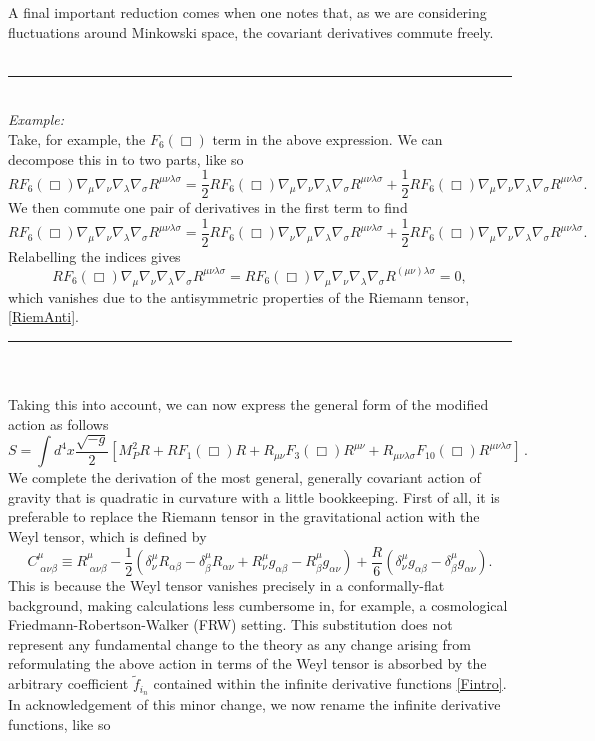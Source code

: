 A final important reduction comes when one notes that, as we are considering fluctuations around Minkowski space, the covariant derivatives commute freely.\\\\
\noindent\rule[0.5ex]{\linewidth}{0.25pt} 
\\\emph{Example:}
\\Take, for example, the $F_6(\Box)$ term in the above expression. We can decompose this in to two parts, like so
\[
RF_{6}(\Box)\nabla_{\mu}\nabla_{\nu}\nabla_{\lambda}\nabla_{\sigma}R^{\mu\nu\lambda\sigma}=\frac{1}{2}RF_{6}(\Box)\nabla_{\mu}\nabla_{\nu}\nabla_{\lambda}\nabla_{\sigma}R^{\mu\nu\lambda\sigma}+\frac{1}{2}RF_{6}(\Box)\nabla_{\mu}\nabla_{\nu}\nabla_{\lambda}\nabla_{\sigma}R^{\mu\nu\lambda\sigma}
.\]
We then commute one pair of derivatives in the first term to find
\[
RF_{6}(\Box)\nabla_{\mu}\nabla_{\nu}\nabla_{\lambda}\nabla_{\sigma}R^{\mu\nu\lambda\sigma}=\frac{1}{2}RF_{6}(\Box)\nabla_{\nu}\nabla_{\mu}\nabla_{\lambda}\nabla_{\sigma}R^{\mu\nu\lambda\sigma}+\frac{1}{2}RF_{6}(\Box)\nabla_{\mu}\nabla_{\nu}\nabla_{\lambda}\nabla_{\sigma}R^{\mu\nu\lambda\sigma}.
\]
Relabelling the indices gives
\[
RF_{6}(\Box)\nabla_{\mu}\nabla_{\nu}\nabla_{\lambda}\nabla_{\sigma}R^{\mu\nu\lambda\sigma}=RF_{6}(\Box)\nabla_{\mu}\nabla_{\nu}\nabla_{\lambda}\nabla_{\sigma}R^{(\mu\nu)\lambda\sigma}=0
,\]
which vanishes due to the antisymmetric properties of the Riemann tensor, \eqref{RiemAnti}.
\noindent\rule[0.5ex]{\linewidth}{0.25pt}
\\\\
Taking this into account, we can now  express the general form of the modified action as follows
\[ \label{f_action}
S=\int d^4x\frac{\sqrt{-g}}{2}\left[M_P^2R+R F_1(\Box)R
+R_{\mu\nu} F_3(\Box)R^{\mu\nu}
+R_{\mu\nu\lambda\sigma} F_{10}(\Box)R^{\mu\nu\lambda\sigma}\right]\,.
\]
We complete the derivation of the most general, generally covariant action of gravity that is quadratic in curvature with a little bookkeeping. First of all, it is preferable to replace the Riemann tensor in the gravitational action with the Weyl tensor, which is defined by
\[
\label{weyl}
C_{\;\alpha\nu\beta}^{\mu}\equiv R_{\;\alpha\nu\beta}^{\mu}-\frac{1}{2}(\delta_{\nu}^{
\mu}R_{\alpha\beta}-\delta_{\beta}^{\mu}R_{\alpha\nu}+R_{\nu}^{\mu}g_{
\alpha\beta}-R_{\beta}^{\mu}g_{\alpha\nu})+\frac{R}{6}(\delta_{\nu}^{\mu}g_{
\alpha\beta}-\delta_{\beta}^{\mu}g_{\alpha\nu})
.\]
This is because the Weyl tensor vanishes precisely in a conformally-flat background, making calculations less cumbersome in, for example, a cosmological Friedmann-Robertson-Walker (FRW) setting. This substitution does not represent any fundamental change to the theory as any change arising from reformulating the above action in terms of the Weyl tensor is absorbed by the arbitrary coefficient ${\tilde f}_{i_n}$ contained within the infinite derivative functions \eqref{Fintro}. In acknowledgement of this minor change, we now rename the infinite derivative functions, like so
